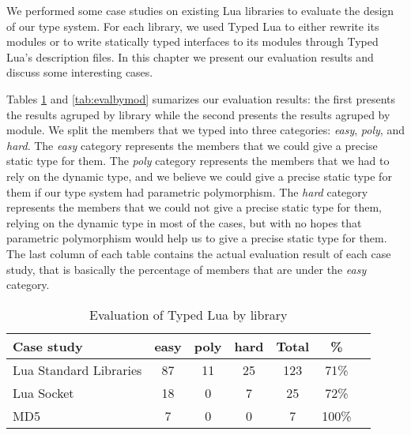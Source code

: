 We performed some case studies on existing Lua libraries
to evaluate the design of our type system.
For each library, we used Typed Lua to either rewrite its modules
or to write statically typed interfaces to its modules through
Typed Lua's description files.
In this chapter we present our evaluation results and discuss
some interesting cases.

Tables \ref{tab:evalbylib} and \ref{tab:evalbymod} sumarizes our
evaluation results:
the first presents the results agruped by library while
the second presents the results agruped by module.
We split the members that we typed into three categories:
\emph{easy}, \emph{poly}, and \emph{hard}.
The \emph{easy} category represents the members that we could give
a precise static type for them.
The \emph{poly} category represents the members that we had to
rely on the dynamic type, and we believe we could give a precise
static type for them if our type system had parametric polymorphism.
The \emph{hard} category represents the members that we could not
give a precise static type for them, relying on the dynamic type
in most of the cases, but with no hopes that parametric polymorphism
would help us to give a precise static type for them.
The last column of each table contains the actual evaluation result
of each case study, that is basically the percentage of members
that are under the \emph{easy} category.

\begin{table}[!ht]
\begin{center}
\begin{tabular}{|l|c|c|c|c|c|c|}
\hline
\textbf{Case study} & \textbf{easy} & \textbf{poly} & \textbf{hard} & \textbf{Total} & \textbf{\%} \\
\hline
Lua Standard Libraries & 87 & 11 & 25 & 123 & 71\% \\
\hline
Lua Socket & 18 & 0 & 7 & 25 & 72\% \\
\hline
MD5 & 7 & 0 & 0 & 7 & 100\% \\
\hline
\end{tabular}
\end{center}
\caption{Evaluation of Typed Lua by library}
\label{tab:evalbylib}
\end{table}

